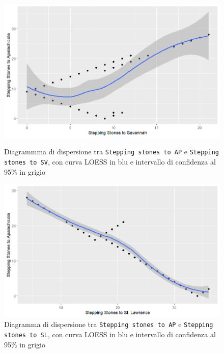 \documentclass{article} %
\begin{document}
\begin{figure}[H]
    \centering
    \begin{minipage}{0.49\textwidth}
        \centering
        \includegraphics[width=\textwidth]{immagini/ap_sv.png}
        \captionsetup{justification=centering}
        \caption{Diagrammma di dispersione tra \texttt{Stepping stones to AP} e \texttt{Stepping stones to SV}, con curva LOESS in blu e intervallo di confidenza al 95\% in grigio}
    \end{minipage}
    \hfill
    \begin{minipage}{0.49\textwidth}
        \centering
        \includegraphics[width=\textwidth]{immagini/ap_sl.png}
        \captionsetup{justification=centering}
        \caption{Diagramma di dispersione tra \texttt{Stepping stones to AP} e \texttt{Stepping stones to SL}, con curva LOESS in blu e intervallo di confidenza al 95\% in grigio}
    \end{minipage}
\end{figure}
\end{document}
